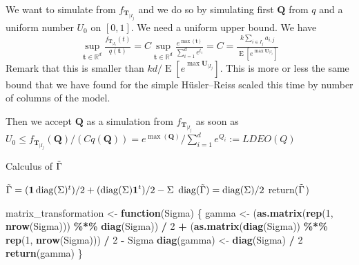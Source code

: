 \documentclass[
]{article}
\newenvironment{Shaded}{\begin{snugshade}}{\end{snugshade}}
\newcommand{\ControlFlowTok}[1]{\textcolor[rgb]{0.13,0.29,0.53}{\textbf{#1}}}
\newcommand{\DecValTok}[1]{\textcolor[rgb]{0.00,0.00,0.81}{#1}}
\newcommand{\FunctionTok}[1]{\textcolor[rgb]{0.13,0.29,0.53}{\textbf{#1}}}
\newcommand{\NormalTok}[1]{#1}
\newcommand{\OtherTok}[1]{\textcolor[rgb]{0.56,0.35,0.01}{#1}}
\newcommand{\SpecialCharTok}[1]{\textcolor[rgb]{0.81,0.36,0.00}{\textbf{#1}}}
\begin{document}
We want to simulate from \(f_{\boldsymbol{T}_{\mid I_j}}\) and we do so
by simulating first \(\boldsymbol{Q}\) from \(q\) and a uniform number
\(U_0\) on \([0,1]\). We need a uniform upper bound. We have \[
\sup_{\boldsymbol{t} \in \mathbb{R}^d } \tfrac{f_{\boldsymbol{T}_{\mid I_j}}(t)}{q(\boldsymbol{t})}=C \sup_{\boldsymbol{t} \in \mathbb{R}^d} \tfrac{e^{\max (\boldsymbol{t})}}{\sum_{i=1}^d e^{t_i}}=C=\tfrac{k\sum_{i \in I_j} a_{i,j}}{\operatorname{E}[e^{\max \boldsymbol{U}_{\mid I_j}}]}
\] Remark that this is smaller than
\(kd/\operatorname{E}[e^{\max \boldsymbol{U}_{\mid I_j}}]\). This is
more or less the same bound that we have found for the simple
Hüsler--Reiss scaled this time by number of columns of the model.

Then we accept \(\boldsymbol{Q}\) as a simulation from
\(f_{\boldsymbol{T}_{\mid I_j}}\) as soon as
\(U_{0}\leq f_{\boldsymbol{T}_{\mid I_j}}(\boldsymbol{Q})/(Cq(\boldsymbol{Q}))=e^{\max (\boldsymbol{Q})}/\sum_{i=1}^d e^{Q_i}:=LDEO(Q)\)

\begin{algorithm}[H]
\caption{  Calculus of $\Tilde{\Gamma}$}\label{alg:cap}
\begin{algorithmic}[1]
\State $\Tilde{\Gamma}=(\boldsymbol{1}\operatorname{diag}(\Sigma)^{t})/2+(\operatorname{diag}(\Sigma)\boldsymbol{1}^t)/2-\Sigma$
\State $\operatorname{diag}(\Tilde{\Gamma})=\operatorname{diag}(\Sigma)/2$
\State return($\Tilde{\Gamma}$)
\EndFunction
\end{algorithmic}
\end{algorithm}

\begin{Shaded}
\begin{Highlighting}[]
\NormalTok{matrix\_transformation }\OtherTok{\textless{}{-}} \ControlFlowTok{function}\NormalTok{(Sigma) \{}
\NormalTok{  gamma }\OtherTok{\textless{}{-}}\NormalTok{ (}\FunctionTok{as.matrix}\NormalTok{(}\FunctionTok{rep}\NormalTok{(}\DecValTok{1}\NormalTok{, }\FunctionTok{nrow}\NormalTok{(Sigma))) }\SpecialCharTok{\%*\%} \FunctionTok{diag}\NormalTok{(Sigma)) }\SpecialCharTok{/} \DecValTok{2} \SpecialCharTok{+}\NormalTok{ (}\FunctionTok{as.matrix}\NormalTok{(}\FunctionTok{diag}\NormalTok{(Sigma)) }\SpecialCharTok{\%*\%} \FunctionTok{rep}\NormalTok{(}\DecValTok{1}\NormalTok{, }\FunctionTok{nrow}\NormalTok{(Sigma))) }\SpecialCharTok{/} \DecValTok{2} \SpecialCharTok{{-}}\NormalTok{ Sigma}
  \FunctionTok{diag}\NormalTok{(gamma) }\OtherTok{\textless{}{-}} \FunctionTok{diag}\NormalTok{(Sigma) }\SpecialCharTok{/} \DecValTok{2}
  \FunctionTok{return}\NormalTok{(gamma)}
\NormalTok{\}}
\end{Highlighting}
\end{Shaded}
\end{document}
